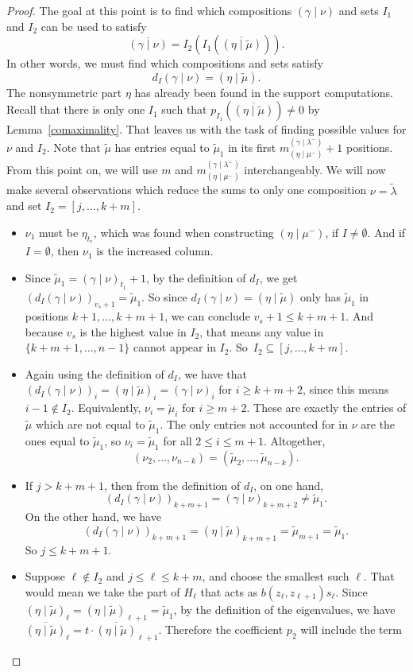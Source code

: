 \documentclass[11pt]{article}
\theoremstyle{definition}
\numberwithin{equation}{section}
\newcommand{\gammalambdamin}{{(\gamma \mid \lambda^-)}}
\newcommand{\gammanu}{{(\gamma \mid \nu)}}
\newcommand{\etamu}{{(\eta \mid \mu^-)}}
\newcommand{\mutilde}{{\widetilde{\mu}}}
\newcommand{\lambdatilde}{{\widetilde{\lambda}}}
\newcommand{\etamutilde}{{(\eta \mid \widetilde{\mu})}}
\newcommand{\mIone}{m_{\etamu}^{\gammalambdamin}}
\newcommand{\dI}{d_I}
\begin{document}
\begin{proof}
The goal at this point is to find which compositions $\gammanu$ and sets $I_1$ and $I_2$ can be used to satisfy
\[\overline{\gammanu} = I_2\left(I_1\left(\overline{\etamutilde}\right)\right). \]
In other words, we must find which compositions and sets satisfy
\[\dI\gammanu = \etamutilde. \]
The nonsymmetric part $\eta$ has already been found in the support computations. Recall that there is only one $I_1$ such that $p_{I_1}\left(\overline{\etamutilde}\right) \neq 0$ by Lemma~\ref{comaximality}. That leaves us with the task of finding possible values for $\nu$ and $I_2$.
 Note that $\mutilde$ has entries equal to $\mutilde_1$ in its first $\mIone+1$ positions. From this point on, we will use $m$ and $\mIone$ interchangeably. We will now make several observations which reduce the sums to only one composition $\nu=\lambdatilde$ and set $I_2=[j, \dotsc,k+m]$. 
\begin{itemize}
    \item $\nu_1$ must be $\eta_{t_r}$, which was found when constructing $\etamu$, if $I \neq \emptyset$. And if $I=\emptyset$, then $\nu_1$ is the increased column.
    \item Since $\mutilde_1 = \gammanu_{t_1}+1$, by the definition of $\dI$, we get $(\dI \gammanu)_{v_s+1} = \mutilde_1$. So since $\dI \gammanu = \etamutilde$ only has $\mutilde_1$ in positions $k+1, \dots, k+m+ 1$, we can conclude $v_s+1 \leq k+ m + 1$. And because $v_s$ is the highest value in $I_2$, that means any value in $\{k+m+1, \dotsc, n-1\}$ cannot appear in $I_2$. So~$I_2 \subseteq [j, \dotsc, k+m]$.
    \item Again using the definition of $d_I$, we have that $(\dI \gammanu)_i = \etamutilde_i = \gammanu_i$ for $i\geq k+m+2$, since this means $i-1 \notin I_2$. Equivalently, $\nu_i = \mutilde_i$ for $i\geq m+2$. These are exactly the entries of $\mutilde$ which are not equal to $\mutilde_1$. The only entries not accounted for in $\nu$ are the ones equal to $\mutilde_1$, so $\nu_i = \mutilde_1$ for all $2\leq i \leq m + 1$.  Altogether,
    \[ (\nu_2, \dotsc, \nu_{n-k}) = (\mutilde_2, \dotsc, \mutilde_{n-k}).\]
    \item If $j>k+m + 1$, then from the definition of $\dI$, on one hand, \[(\dI \gammanu)_{k+m+1}=\gammanu_{k+m+2} \neq \mutilde_1.\]
    On the other hand, we have
    \[ (\dI \gammanu)_{k+m+1} = \etamutilde_{k+m + 1} = \mutilde_{m+1} = \mutilde_1.\]
    So $j\leq k+m+1$.
    \item Suppose $\ell \notin I_2$ and $j \leq \ell \leq k+m$, and choose the smallest such $\ell$. That would mean we take the part of $H_\ell$ that acts as $b(z_\ell, z_{\ell+1}) s_\ell$. Since $\etamutilde_\ell = \etamutilde_{\ell+1}=\mutilde_1$, by the definition of the eigenvalues, we have $\overline{\etamutilde}_\ell = t\cdot \overline{\etamutilde}_{\ell+1}$. Therefore the coefficient $p_2$ will include the term 

\end{itemize}
\end{proof}
\end{document}
